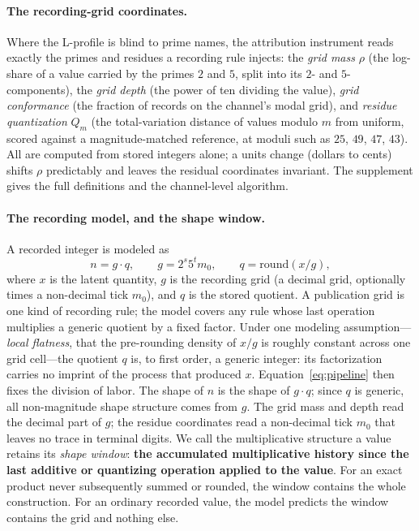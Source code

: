\documentclass[12pt]{article}
\newcommand{\rmass}{\rho}
\begin{document}
\paragraph{The recording-grid coordinates.}
Where the L-profile is blind to prime names, the attribution instrument reads exactly
the primes and residues a recording rule injects: the \emph{grid mass}
$\rmass$ (the log-share of a value carried by the primes $2$ and $5$, split
into its $2$- and $5$-components), the \emph{grid depth} (the power of ten
dividing the value), \emph{grid conformance} (the fraction of records on the
channel's modal grid), and \emph{residue quantization} $Q_m$ (the
total-variation distance of values modulo $m$ from uniform, scored against a
magnitude-matched reference, at moduli such as $25$, $49$, $47$, $43$). All
are computed from stored integers alone; a units change (dollars to cents)
shifts $\rmass$ predictably and leaves the residual coordinates invariant. The
supplement gives the full definitions and the channel-level algorithm.

\paragraph{The recording model, and the shape window.}
A recorded integer is modeled as
\begin{equation}
n = g \cdot q, \qquad g = 2^{s} 5^{t} m_0, \qquad
q = \mathrm{round}(x / g),
\label{eq:pipeline}
\end{equation}
where $x$ is the latent quantity, $g$ is the recording grid (a decimal grid,
optionally times a non-decimal tick $m_0$), and $q$ is the stored quotient.
A publication grid is one kind of recording rule; the model covers any rule
whose last operation multiplies a generic quotient by a fixed factor.
Under one modeling assumption---\emph{local flatness}, that the pre-rounding
density of $x/g$ is roughly constant across one grid cell---the quotient $q$
is, to first order, a generic integer: its factorization carries no imprint of
the process that produced $x$. Equation~\eqref{eq:pipeline} then fixes the
division of labor. The shape of $n$ is the shape of $g \cdot q$; since $q$ is
generic, all non-magnitude shape structure comes from $g$. The grid mass and
depth read the decimal part of $g$; the residue coordinates read a non-decimal
tick $m_0$ that leaves no trace in terminal digits. We call the multiplicative
structure a value retains its \emph{shape window}: \textbf{the accumulated
multiplicative history since the last additive or quantizing operation applied
to the value}. For an exact product never subsequently summed or rounded, the
window contains the whole construction. For an ordinary recorded value, the
model predicts the window contains the grid and nothing else.
\end{document}
